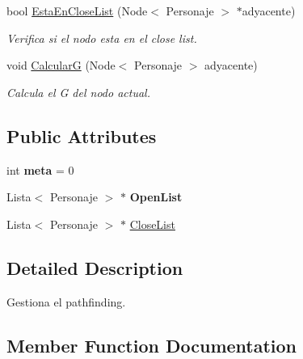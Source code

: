 \begin{DoxyCompactItemize}
bool \hyperlink{classPathfinding_a22be584e0676401e57bb745f58f84612}{Esta\+En\+Close\+List} (Node$<$ Personaje $>$ $\ast$adyacente)
\begin{DoxyCompactList}\small\item\em Verifica si el nodo esta en el close list. \end{DoxyCompactList}\item 
\mbox{\label{classPathfinding_a51b5bc1a18435727fd31553a4c210977}} 
void \hyperlink{classPathfinding_a51b5bc1a18435727fd31553a4c210977}{CalcularG} (Node$<$ Personaje $>$ adyacente)
\begin{DoxyCompactList}\small\item\em Calcula el G del nodo actual. \end{DoxyCompactList}\end{DoxyCompactItemize}
\subsection*{Public Attributes}
\begin{DoxyCompactItemize}
\item 
\mbox{\label{classPathfinding_ad93d647462a2a4b70fe592b3232da348}} 
int {\bfseries meta} = 0
\item 
\mbox{\label{classPathfinding_ad4254d7400d8e29831186d88cb4cd3f7}} 
Lista$<$ Personaje $>$ $\ast$ {\bfseries Open\+List}
\item 
Lista$<$ Personaje $>$ $\ast$ \hyperlink{classPathfinding_a8b4acb83403fad6e58c515754bbb66d1}{Close\+List}
\end{DoxyCompactItemize}


\subsection{Detailed Description}
Gestiona el pathfinding. 

\subsection{Member Function Documentation}
\mbox{\label{classPathfinding_a1957044dbd67841116e29523b93f2d56}} 
